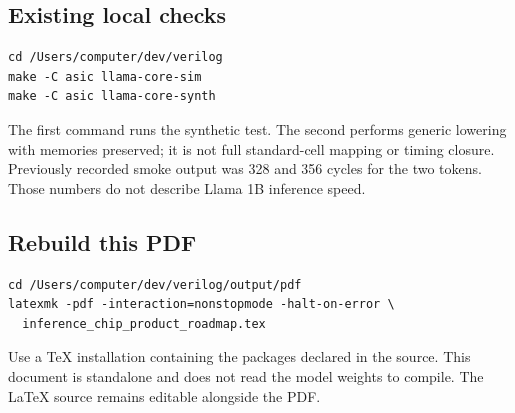 \documentclass[11pt,a4paper]{article}
\begin{document}
\subsection*{Existing local checks}
\begin{lstlisting}
cd /Users/computer/dev/verilog
make -C asic llama-core-sim
make -C asic llama-core-synth
\end{lstlisting}
The first command runs the synthetic test. The second performs generic lowering
with memories preserved; it is not full standard-cell mapping or timing closure.
Previously recorded smoke output was 328 and 356 cycles for the two tokens.
Those numbers do not describe Llama 1B inference speed.

\subsection*{Rebuild this PDF}
\begin{lstlisting}
cd /Users/computer/dev/verilog/output/pdf
latexmk -pdf -interaction=nonstopmode -halt-on-error \
  inference_chip_product_roadmap.tex
\end{lstlisting}
Use a TeX installation containing the packages declared in the source. This
document is standalone and does not read the model weights to compile. The
LaTeX source remains editable alongside the PDF.
\end{document}
